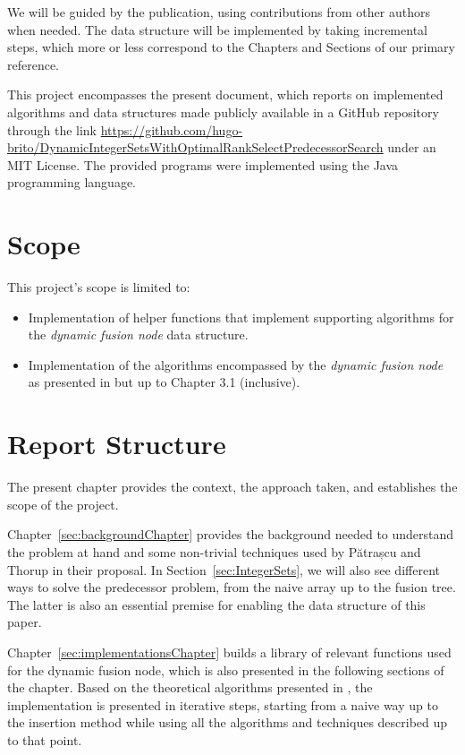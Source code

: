 We will be guided by the \cite{patrascu2014dynamic} publication, using contributions from other authors when needed. The data structure will be implemented by taking incremental steps, which more or less correspond to the Chapters and Sections of our primary reference.

This project encompasses the present document, which reports on implemented algorithms and data structures made publicly available in a GitHub repository through the link \url{https://github.com/hugo-brito/DynamicIntegerSetsWithOptimalRankSelectPredecessorSearch} under an MIT License.
The provided programs were implemented using the Java programming language.

\section{Scope} \label{sec:scope}

This project's scope is limited to:
\begin{itemize}
    \item
    Implementation of helper functions that implement supporting algorithms for the \textit{dynamic fusion node} data structure.
    
    \item
    Implementation of the algorithms encompassed by the \textit{dynamic fusion node} as presented in \cite{patrascu2014dynamic} but up to Chapter 3.1 (inclusive).
\end{itemize}

\section{Report Structure}

The present chapter provides the context, the approach taken, and establishes the scope of the project.

Chapter~\ref{sec:backgroundChapter} provides the background needed to understand the problem at hand and some non-trivial techniques used by Pătrașcu and Thorup in their proposal.
In Section~\ref{sec:IntegerSets}, we will also see different ways to solve the predecessor problem, from the naive array up to the fusion tree. The latter is also an essential premise for enabling the data structure of this paper.

Chapter~\ref{sec:implementationsChapter} builds a library of relevant functions used for the dynamic fusion node, which is also presented in the following sections of the chapter.
Based on the theoretical algorithms presented in \cite{patrascu2014dynamic}, the implementation is presented in iterative steps, starting from a naive way up to the insertion method while using all the algorithms and techniques described up to that point.


